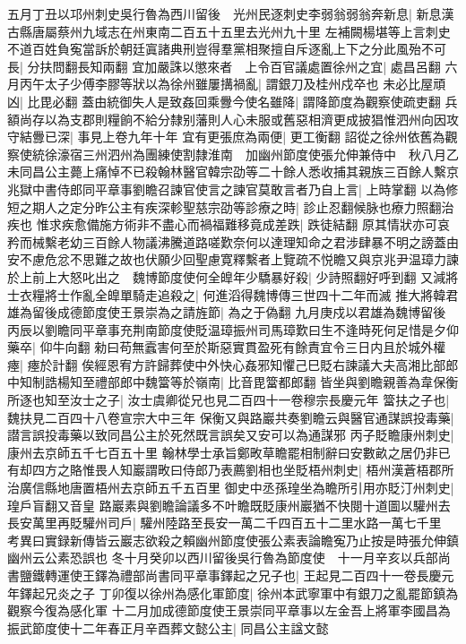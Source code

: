 五月丁丑以邛州刺史吳行魯為西川留後　光州民逐刺史李弱翁弱翁奔新息|{
	新息漢古縣唐屬蔡州九域志在州東南二百五十五里去光州九十里}
左補闕楊堪等上言刺史不道百姓負寃當訴於朝廷寘諸典刑豈得羣黨相聚擅自斥逐亂上下之分此風殆不可長|{
	分扶問翻長知兩翻}
宜加嚴誅以懲來者　上令百官議處置徐州之宜|{
	處昌呂翻}
六月丙午太子少傅李膠等狀以為徐州雖屢搆禍亂|{
	謂銀刀及桂州戍卒也}
未必比屋頑凶|{
	比毘必翻}
蓋由統御失人是致姦回乘釁今使名雖降|{
	謂降節度為觀察使疏吏翻}
兵額尚存以為支郡則糧餉不給分隸别藩則人心未服或舊惡相濟更成披猖惟泗州向因攻守結釁已深|{
	事見上卷九年十年}
宜有更張庶為兩便|{
	更工衡翻}
詔從之徐州依舊為觀察使統徐濠宿三州泗州為團練使割隸淮南　加幽州節度使張允伸兼侍中　秋八月乙未同昌公主薨上痛悼不已殺翰林醫官韓宗劭等二十餘人悉收捕其親族三百餘人繫京兆獄中書侍郎同平章事劉瞻召諫官使言之諫官莫敢言者乃自上言|{
	上時掌翻}
以為修短之期人之定分昨公主有疾深軫聖慈宗劭等診療之時|{
	診止忍翻候脉也療力照翻治疾也}
惟求疾愈備施方術非不盡心而禍福難移竟成差跌|{
	跌徒結翻}
原其情狀亦可哀矜而械繫老幼三百餘人物議沸騰道路嗟歎奈何以達理知命之君涉肆暴不明之謗蓋由安不慮危忿不思難之故也伏願少回聖慮寛釋繫者上覽疏不悦瞻又與京兆尹温璋力諫於上前上大怒叱出之　魏博節度使何全皥年少驕暴好殺|{
	少詩照翻好呼到翻}
又減將士衣糧將士作亂全皥單騎走追殺之|{
	何進滔得魏博傳三世四十二年而滅}
推大將韓君雄為留後成德節度使王景崇為之請旌節|{
	為之于偽翻}
九月庚戍以君雄為魏博留後　丙辰以劉瞻同平章事充荆南節度使貶温璋振州司馬璋歎曰生不逢時死何足惜是夕仰藥卒|{
	仰牛向翻}
勑曰苟無蠧害何至於斯惡實貫盈死有餘責宜令三日内且於城外權瘞|{
	瘞於計翻}
俟經恩宥方許歸葬使中外快心姦邪知懼己巳貶右諫議大夫高湘比部郎中知制誥楊知至禮部郎中魏簹等於嶺南|{
	比音毘簹都郎翻}
皆坐與劉瞻親善為韋保衡所逐也知至汝士之子|{
	汝士虞卿從兄也見二百四十一卷穆宗長慶元年}
簹扶之子也|{
	魏扶見二百四十八卷宣宗大中三年}
保衡又與路巖共奏劉瞻云與醫官通謀誤投毒藥|{
	譛言誤投毒藥以致同昌公主於死然既言誤矣又安可以為通謀邪}
丙子貶瞻康州刺史|{
	康州去京師五千七百五十里}
翰林學士承旨鄭畋草瞻罷相制辭曰安數畝之居仍非已有却四方之賂惟畏人知巖謂畋曰侍郎乃表薦劉相也坐貶梧州刺史|{
	梧州漢蒼梧郡所治廣信縣地唐置梧州去京師五千五百里}
御史中丞孫瑝坐為瞻所引用亦貶汀州刺史|{
	瑝戶盲翻又音皇}
路巖素與劉瞻論議多不叶瞻既貶康州巖猶不快閱十道圖以驩州去長安萬里再貶驩州司戶|{
	驩州陸路至長安一萬二千四百五十二里水路一萬七千里　考異曰實録新傳皆云巖志欲殺之賴幽州節度使張公素表論瞻寃乃止按是時張允伸鎮幽州云公素恐誤也}
冬十月癸卯以西川留後吳行魯為節度使　十一月辛亥以兵部尚書鹽鐵轉運使王鐸為禮部尚書同平章事鐸起之兄子也|{
	王起見二百四十一卷長慶元年鐸起兄炎之子}
丁卯復以徐州為感化軍節度|{
	徐州本武寧軍中有銀刀之亂罷節鎮為觀察今復為感化軍}
十二月加成德節度使王景崇同平章事以左金吾上將軍李國昌為振武節度使十二年春正月辛酉葬文懿公主|{
	同昌公主諡文懿}

